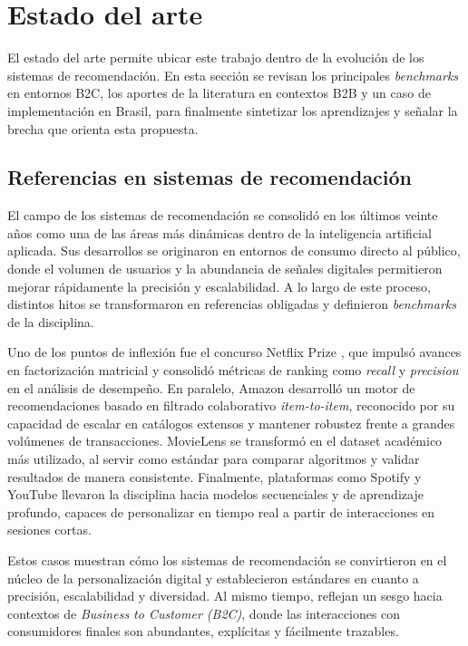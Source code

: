 
\section{Estado del arte}

El estado del arte permite ubicar este trabajo dentro de la evolución de los sistemas de recomendación. En esta sección se revisan los principales \textit{benchmarks} en entornos B2C, los aportes de la literatura en contextos B2B y un caso de implementación en Brasil, para finalmente sintetizar los aprendizajes y señalar la brecha que orienta esta propuesta.

\subsection{Referencias en sistemas de recomendación}

El campo de los sistemas de recomendación se consolidó en los últimos veinte años como una de las áreas más dinámicas dentro de la inteligencia artificial aplicada. Sus desarrollos se originaron en entornos de consumo directo al público, donde el volumen de usuarios y la abundancia de señales digitales permitieron mejorar rápidamente la precisión y escalabilidad. A lo largo de este proceso, distintos hitos se transformaron en referencias obligadas y definieron \textit{benchmarks} de la disciplina.

Uno de los puntos de inflexión fue el concurso Netflix Prize \cite{ARTICLE:NetflixPrize}, que impulsó avances en factorización matricial y consolidó métricas de ranking como \textit{recall} y \textit{precision} en el análisis de desempeño. En paralelo, Amazon desarrolló un motor de recomendaciones basado en filtrado colaborativo \textit{item-to-item}, reconocido por su capacidad de escalar en catálogos extensos y mantener robustez frente a grandes volúmenes de transacciones. MovieLens \cite{ARTICLE:MovieLens} se transformó en el dataset académico más utilizado, al servir como estándar para comparar algoritmos y validar resultados de manera consistente. Finalmente, plataformas como Spotify y YouTube llevaron la disciplina hacia modelos secuenciales y de aprendizaje profundo, capaces de personalizar en tiempo real a partir de interacciones en sesiones cortas.

Estos casos muestran cómo los sistemas de recomendación se convirtieron en el núcleo de la personalización digital y establecieron estándares en cuanto a precisión, escalabilidad y diversidad. Al mismo tiempo, reflejan un sesgo hacia contextos de  \textit{Business to Customer (B2C)}, donde las interacciones con consumidores finales son abundantes, explícitas y fácilmente trazables.

